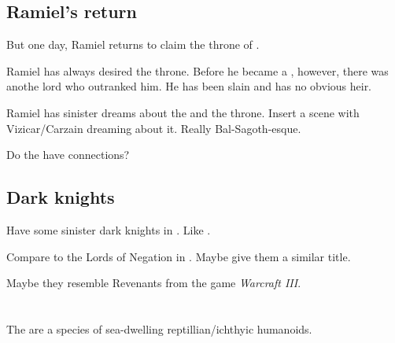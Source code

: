 \subsection{Ramiel's return}
\label{\Mystraacht{} \matrix}
But one day, Ramiel returns to claim the throne of \Mystraacht. 


Ramiel has always desired the \Mystraacht{} throne. Before he became a \malach, however, there was anothe \Mystraacht{} lord who outranked him. He has been slain and has no obvious heir. 

Ramiel has sinister dreams about the \Mystraacht{} \matrix{} and the throne. Insert a scene with Vizicar/Carzain dreaming about it. Really Bal-Sagoth-esque. 


Do the \Mystraacht{} have \ophidian{} connections?







\subsection{Dark knights}
\label{Dark knights of Mystraacht}
Have some sinister dark knights in \Mystraacht. Like . 

Compare to the Lords of Negation in \FLuneNoire. Maybe give them a similar title. 

Maybe they resemble Revenants from the game \emph{Warcraft III}. 















\section{\Nagae{}}
\label{Nagae}
\label{Vlekkesh'sala}
The \nagae{} are a species of sea-dwelling reptillian/ichthyic humanoids. 

